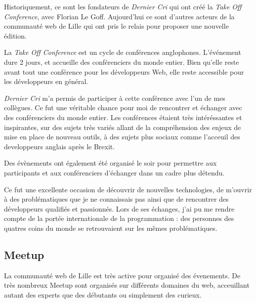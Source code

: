 \documentclass[12pt,a4paper]{article}
\begin{document}
  \bigskip

  Historiquement, ce sont les fondateurs de \emph{Dernier Cri} qui ont
  créé la \emph{Take Off Conference}, avec Florian Le Goff. Aujourd'hui ce
  sont d'autres acteurs de la communauté web de Lille qui ont pris le
  relais pour proposer une nouvelle édition.

  \bigskip

  La \emph{Take Off Conference} est un cycle de conférences anglophones.
  L'événement dure 2 jours, et accueille des conférenciers du monde
  entier. Bien qu'elle reste avant tout une conférence pour les
  développeurs Web, elle reste accessible pour les développeurs en
  général.

  \bigskip

  \emph{Dernier Cri} m'a permis de participer à cette conférence avec l'un
  de mes collègues. Ce fut une véritable chance pour moi de rencontrer et
  échanger avec des conférenciers du monde entier. Les conférences étaient
  très intéréssantes et inspirantes, sur des sujets très variés allant de
  la compréhension des enjeux de mise en place de nouveau outils, à des
  sujets plus sociaux comme l'acceuil des developpeurs anglais après le
  Brexit.

  \bigskip

  Des évènements ont également été organisé le soir pour permettre aux
  participants et aux conférenciers d'échanger dans un cadre plus détendu.

  \bigskip

  Ce fut une excellente occasion de découvrir de nouvelles technologies,
  de m'ouvrir à des problématiques que je ne connaissais pas ainsi que de
  rencontrer des développeurs qualifiés et passionnés. Lors de ses
  échanges, j'ai pu me rendre compte de la portée internationale de la
  programmation : des personnes des quatres coins du monde se retrouvaient
  sur les mêmes problématiques.

  \bigskip

  \subsection{Meetup}\label{meetup}

  \bigskip

  La communauté web de Lille est très active pour organisé des évenements.
  De très nombreux Meetup sont organisés sur différents domaines du web,
  acceuillant autant des experts que des débutants ou simplement des
  curieux.
\end{document}
